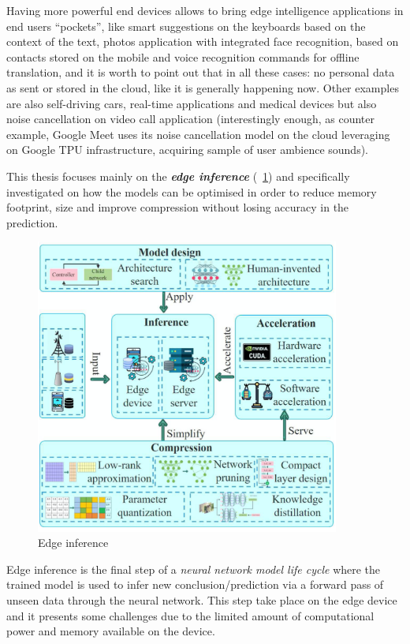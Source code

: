 Having more powerful end devices allows to bring edge intelligence applications
in end users ``pockets'', like smart suggestions on the keyboards based on the
context of the text, photos application with integrated face recognition, based
on contacts stored on the mobile and voice recognition commands for offline
translation, and it is worth to point out that in all these cases: no personal
data as sent or stored in the cloud, like it is generally happening now.
Other examples are also self-driving cars, real-time applications and medical
devices but also noise cancellation on video call application (interestingly
enough, as counter example, Google Meet uses its noise cancellation model on
the cloud leveraging on Google TPU infrastructure, acquiring sample of user
ambience sounds\cite{googlemeetnoise}).

This thesis focuses mainly on the \textbf{\textit{edge inference}}
(~\ref{fig:edge_inference}) and specifically investigated on how the models can
be optimised in order to reduce memory footprint, size and improve compression
without losing accuracy in the prediction.

\begin{figure}[ht]
    \includegraphics[width=10cm]{images/introduction/edge_inference.png}
    \centering
    \caption{Edge inference}\label{fig:edge_inference}
\end{figure}

Edge inference is the final step of a \textit{neural network model life cycle}
where the trained model is used to infer new conclusion/prediction via a
forward pass of unseen data through the neural network.
This step take place on the edge device and it presents some challenges due to
the limited amount of computational power and memory available on the device.

